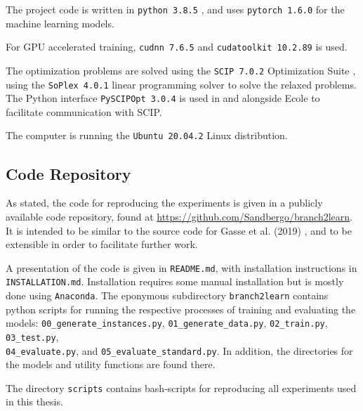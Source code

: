 The project code is written in 
\verb|python 3.8.5| \cite{rossum2009python}, and uses               
\verb|pytorch 1.6.0| \cite{paszke2019pytorch} for the machine learning models.           

For \gls{GPU} accelerated training, 
\verb|cudnn 7.6.5| and 
\verb|cudatoolkit 10.2.89| \cite{kirk2008nvidia} is used. 

The optimization problems are solved using the \verb|SCIP 7.0.2| Optimization Suite \cite{gamrath2020scip}, using the 
\verb|SoPlex 4.0.1| \cite{wunderling1996soplex} linear programming solver to solve the relaxed problems. The Python interface
\verb|PySCIPOpt 3.0.4| \cite{maher2016pyscipopt} is used in and alongside \gls{Ecole} to facilitate communication with \gls{SCIP}.

The computer is running the \verb|Ubuntu 20.04.2| Linux distribution.


\subsection{Code Repository}

As stated, the code for reproducing the experiments is given in a publicly available code repository, found at \url{https://github.com/Sandbergo/branch2learn}. It is intended to be similar to the source code for Gasse et al. (2019) \cite{gasse2019exact}, and to be extensible in order to facilitate further work. 

A presentation of the code is given in \verb|README.md|, with installation instructions in \verb|INSTALLATION.md|. Installation requires some manual installation but is mostly done using \verb|Anaconda|. The eponymous subdirectory \verb|branch2learn| contains python scripts for running the respective processes of training and evaluating the models: \verb|00_generate_instances.py|, \verb|01_generate_data.py|, \verb|02_train.py|,
\verb|03_test.py|, \\
\verb|04_evaluate.py|, and \verb|05_evaluate_standard.py|. In addition, the directories for the models and utility functions are found there.

The directory \verb|scripts| contains bash-scripts for reproducing all experiments used in this thesis. 